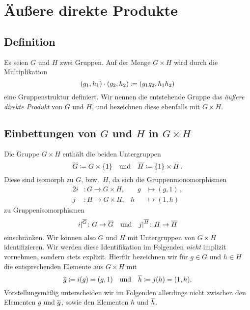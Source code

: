 \section{Äußere direkte Produkte}





\subsection*{Definition}

Es seien $G$ und $H$ zwei Gruppen.
Auf der Menge $G \times H$ wird durch die Multiplikation
\[
          (g_1, h_1) \cdot (g_2, h_2)
  \coloneqq (g_1 g_2, h_1 h_2)
\]
eine Gruppenstruktur definiert.
Wir nennen die entstehende Gruppe das \emph{äußere direkte Produkt} von $G$ und $H$, und bezeichnen diese ebenfalls mit $G \times H$.





\subsection*{Einbettungen von \texorpdfstring{$G$}{G} und \texorpdfstring{$H$}{H} in \texorpdfstring{$G \times H$}{G x H}}

Die Gruppe $G \times H$ enthält die beiden Untergruppen
\[
          \overline{G}
  \coloneqq G \times \{1\}
  \quad\text{und}\quad
          \overline{H}
  \coloneqq \{1\} \times H \,.
\]
Diese sind isomorph zu $G$, bzw.\ $H$, da sich die Gruppenmonomorphismen
\begin{alignat*}{2}
            i
  &\colon   G
   \to      G \times H,
   &
   \quad    g
  &\mapsto  (g,1) \,,
  \\
            j
  &\colon   H
   \to      G \times H,
   &
            h
  &\mapsto (1,h)
\end{alignat*}
zu Gruppenisomorphismen
\[
        \restrict{i}{}[\induced{G}]
 \colon G
 \to    \induced{G}
 \quad\text{und}\quad
        \restrict{j}{}[\induced{H}]
 \colon H
 \to    \induced{H}
\]
einschränken.
Wir können also $G$ und $H$ mit Untergruppen von $G \times H$ identifizieren.
Wir werden diese Identifikation im Folgenden \emph{nicht} implizit vornehmen, sondern stets explizit.
Hierfür bezeichnen wir für $g \in G$ und $h \in H$ die entsprechenden Elemente aus $G \times H$ mit
\[
          \overline{g}
  \coloneqq i(g)
  =       (g,1)
  \quad\text{und}\quad
          \overline{h}
  \coloneqq j(h)
  =       (1,h).
\]
Vorstellungsmäßig unterscheiden wir im Folgenden allerdings nicht zwischen den Elementen $g$ und $\overline{g}$, sowie den Elementen $h$ und $\overline{h}$.





